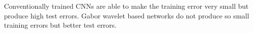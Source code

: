 \documentclass[11pt, a4paper]{article}
\begin{document}
Conventionally trained \acp{CNN} are able to make the training error very small but produce high test errors. Gabor wavelet based networks do not produce so small training errors but better test errors.

\newpage


\begin{appendix}
\label{appendix}


\end{appendix}
\end{document}
